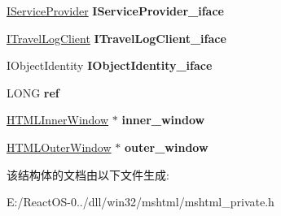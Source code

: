 \begin{DoxyCompactItemize}
\hyperlink{interface_i_service_provider}{I\+Service\+Provider} {\bfseries I\+Service\+Provider\+\_\+iface}
\item 
\mbox{\label{struct_h_t_m_l_window_a4e0bf4205c1fdb78037d8fedda8cae0a}} 
\hyperlink{interface_i_travel_log_client}{I\+Travel\+Log\+Client} {\bfseries I\+Travel\+Log\+Client\+\_\+iface}
\item 
\mbox{\label{struct_h_t_m_l_window_a76a77d400e234bca496311cae1c78ea0}} 
I\+Object\+Identity {\bfseries I\+Object\+Identity\+\_\+iface}
\item 
\mbox{\label{struct_h_t_m_l_window_a7fb335a154b0745504d76e6030bec9ac}} 
L\+O\+NG {\bfseries ref}
\item 
\mbox{\label{struct_h_t_m_l_window_a8fa9c2d2b2bccec5637ac4835d5c59a5}} 
\hyperlink{struct_h_t_m_l_inner_window}{H\+T\+M\+L\+Inner\+Window} $\ast$ {\bfseries inner\+\_\+window}
\item 
\mbox{\label{struct_h_t_m_l_window_ac9daffc8d16a7935addd4b835e8f57e6}} 
\hyperlink{struct_h_t_m_l_outer_window}{H\+T\+M\+L\+Outer\+Window} $\ast$ {\bfseries outer\+\_\+window}
\end{DoxyCompactItemize}


该结构体的文档由以下文件生成\+:\begin{DoxyCompactItemize}
\item 
E\+:/\+React\+O\+S-\/0../dll/win32/mshtml/mshtml\+\_\+private.\+h\end{DoxyCompactItemize}
